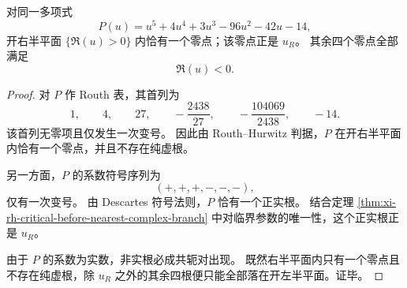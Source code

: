 \begin{proposition}[临界五次方程的唯一右半平面根与左半平面余根]\label{prop:xi-collision-threshold-quintic-halfplane-root-distribution}
对同一多项式
\[
P(u)=u^5+4u^4+3u^3-96u^2-42u-14,
\]
开右半平面 \(\{\Re(u)>0\}\) 内恰有一个零点；该零点正是 \(u_R\)。
其余四个零点全部满足
\[
\Re(u)<0.
\]
\end{proposition}
\begin{proof}
对 \(P\) 作 Routh 表，其首列为
\[
1,\qquad
4,\qquad
27,\qquad
-\frac{2438}{27},\qquad
-\frac{104069}{2438},\qquad
-14.
\]
该首列无零项且仅发生一次变号。
因此由 Routh--Hurwitz 判据，\(P\) 在开右半平面内恰有一个零点，并且不存在纯虚根。

另一方面，\(P\) 的系数符号序列为
\[
(+,+,+,-,-,-),
\]
仅有一次变号。
由 Descartes 符号法则，\(P\) 恰有一个正实根。
结合定理 \ref{thm:xi-rh-critical-before-nearest-complex-branch} 中对临界参数的唯一性，这个正实根正是 \(u_R\)。

由于 \(P\) 的系数为实数，非实根必成共轭对出现。
既然右半平面内只有一个零点且不存在纯虚根，除 \(u_R\) 之外的其余四根便只能全部落在开左半平面。证毕。
\end{proof}

\endinput

